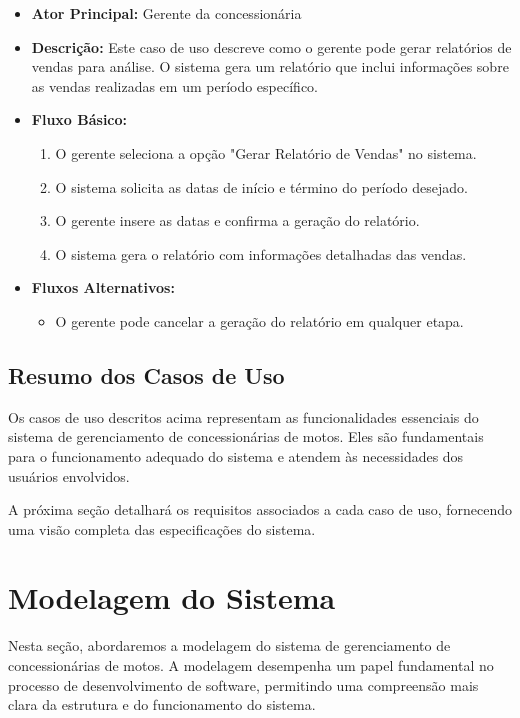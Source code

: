 \begin{itemize}
	\item \textbf{Ator Principal:} Gerente da concessionária
	\item \textbf{Descrição:} Este caso de uso descreve como o gerente pode gerar relatórios de vendas para análise. O sistema gera um relatório que inclui informações sobre as vendas realizadas em um período específico.
	\item \textbf{Fluxo Básico:}
	\begin{enumerate}
		\item O gerente seleciona a opção "Gerar Relatório de Vendas" no sistema.
		\item O sistema solicita as datas de início e término do período desejado.
		\item O gerente insere as datas e confirma a geração do relatório.
		\item O sistema gera o relatório com informações detalhadas das vendas.
	\end{enumerate}
	\item \textbf{Fluxos Alternativos:}
	\begin{itemize}
		\item O gerente pode cancelar a geração do relatório em qualquer etapa.
	\end{itemize}
\end{itemize}

\subsection{Resumo dos Casos de Uso}

Os casos de uso descritos acima representam as funcionalidades essenciais do sistema de gerenciamento de concessionárias de motos. Eles são fundamentais para o funcionamento adequado do sistema e atendem às necessidades dos usuários envolvidos.

A próxima seção detalhará os requisitos associados a cada caso de uso, fornecendo uma visão completa das especificações do sistema.



\section{Modelagem do Sistema}

Nesta seção, abordaremos a modelagem do sistema de gerenciamento de concessionárias de motos. A modelagem desempenha um papel fundamental no processo de desenvolvimento de software, permitindo uma compreensão mais clara da estrutura e do funcionamento do sistema.

